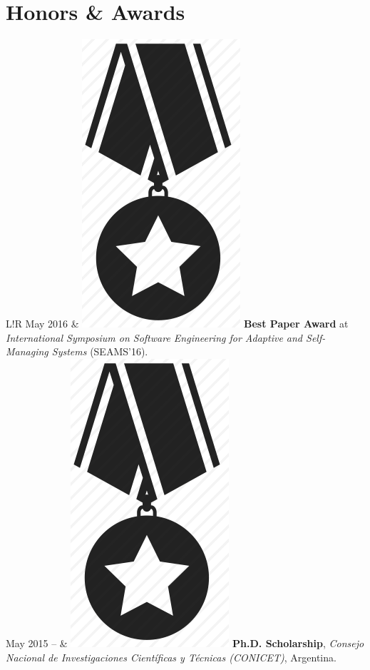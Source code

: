 \documentclass[10pt]{article}
\newcommand\VRule{\color{lightgray}\vrule width 0.5pt}
\begin{document}
\section*{Honors \& Awards}

\begin{tabular}{L!{\VRule}R}
May 2016 & \includegraphics[scale=0.022]{../img/medal.png}
\textbf{Best Paper Award} at \textit{International Symposium on 
Software Engineering for Adaptive and Self-Managing Systems} (SEAMS'16).\\

May 2015 -- & \includegraphics[scale=0.022]{../img/medal.png} \hspace{-0.85mm} 
\textbf{Ph.D. 
Scholarship}, \textit{Consejo Nacional de 
Investigaciones Cient\'ificas y T\'ecnicas (CONICET)}, Argentina.\\


\end{tabular}
\end{document}
